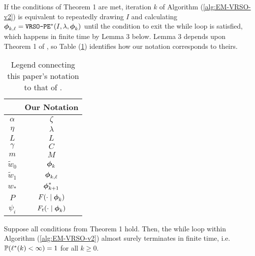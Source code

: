 If the conditions of Theorem 1 are met, iteration $k$ of Algorithm (\ref{alg:EM-VRSO-v2}) is equivalent to repeatedly drawing $I$ and calculating $\boldsymbol{\phi}_{k,\ell} = \texttt{VRSO-PE}^*(I,\lambda,\boldsymbol{\phi}_{k})$ until the condition to exit the while loop is satisfied, which happens in finite time by Lemma 3 below. Lemma 3 depends upon Theorem 1 of \citet{Johnson:2013}, so Table (\ref{tbl:notation}) identifies how our notation corresponds to theirs.
%
\begin{table}[]
\centering
\begin{tabular}{c|c}
\citet{Johnson:2013}                  & Our Notation                          \\ \hline
$\alpha$                              & $\zeta$                               \\
$\eta$                                & $\lambda$                             \\
$L$                                   & $L$                                   \\
$\gamma$                              & $C$                                   \\
$m$                                   & $M$                                   \\
$\tilde{w}_0$                         & $\boldsymbol{\phi}_{k}$                          \\
$\tilde{w}_1$                         & $\boldsymbol{\phi}_{k,\ell}$                     \\
$w_{*}$                               & $\boldsymbol{\phi}^*_{k+1}$                      \\
$P$                                   & $F(\cdot \mid \boldsymbol{\phi}_k)$              \\
$\psi_i$                              & $F_t(\cdot \mid \boldsymbol{\phi}_k)$                         
\end{tabular}
\caption{Legend connecting this paper's notation to that of \citet{Johnson:2013}.}
\label{tbl:notation}
\end{table}

\begin{lemma}
    Suppose all conditions from Theorem 1 hold. Then, the while loop within Algorithm (\ref{alg:EM-VRSO-v2}) almost surely terminates in finite time, i.e. $\mathbb{P}(\ell^*(k) < \infty) = 1$ for all $k \geq 0.$
\end{lemma}

